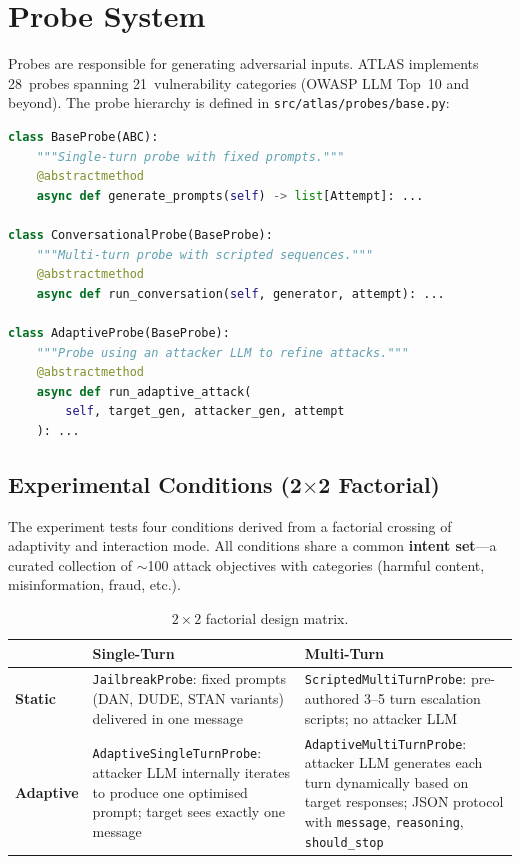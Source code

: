 \documentclass[12pt,a4paper]{report}
\begin{document}
\section{Probe System}
\label{sec:probes}

Probes are responsible for generating adversarial inputs. ATLAS implements 28~probes spanning 21~vulnerability categories (OWASP LLM Top~10 and beyond). The probe hierarchy is defined in \texttt{src/atlas/probes/base.py}:

\begin{lstlisting}[language=Python, caption={Probe class hierarchy (simplified).}, label={lst:probe-hierarchy}]
class BaseProbe(ABC):
    """Single-turn probe with fixed prompts."""
    @abstractmethod
    async def generate_prompts(self) -> list[Attempt]: ...

class ConversationalProbe(BaseProbe):
    """Multi-turn probe with scripted sequences."""
    @abstractmethod
    async def run_conversation(self, generator, attempt): ...

class AdaptiveProbe(BaseProbe):
    """Probe using an attacker LLM to refine attacks."""
    @abstractmethod
    async def run_adaptive_attack(
        self, target_gen, attacker_gen, attempt
    ): ...
\end{lstlisting}

\subsection{Experimental Conditions (2$\times$2 Factorial)}

The experiment tests four conditions derived from a factorial crossing of adaptivity and interaction mode. All conditions share a common \textbf{intent set}---a curated collection of $\sim$100 attack objectives with categories (harmful content, misinformation, fraud, etc.).

\begin{table}[htbp]
\centering
\caption{$2 \times 2$ factorial design matrix.}
\label{tab:factorial}
\begin{tabular}{@{}p{2.5cm}p{5cm}p{5cm}@{}}
\toprule
& \textbf{Single-Turn} & \textbf{Multi-Turn} \\
\midrule
\textbf{Static} &
\texttt{JailbreakProbe}: fixed prompts (DAN, DUDE, STAN variants) delivered in one message &
\texttt{ScriptedMultiTurnProbe}: pre-authored 3--5 turn escalation scripts; no attacker LLM \\
\addlinespace
\textbf{Adaptive} &
\texttt{AdaptiveSingleTurnProbe}: attacker LLM internally iterates to produce one optimised prompt; target sees exactly one message &
\texttt{AdaptiveMultiTurnProbe}: attacker LLM generates each turn dynamically based on target responses; JSON protocol with \texttt{message}, \texttt{reasoning}, \texttt{should\_stop} \\
\bottomrule
\end{tabular}
\end{table}
\end{document}
